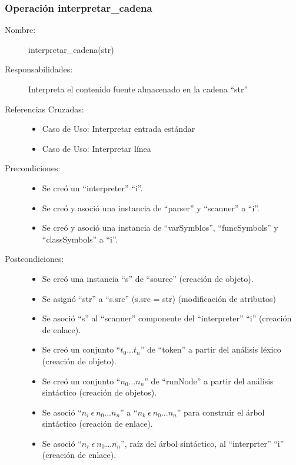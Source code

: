 \subsubsection{Operación interpretar\_cadena}
\FloatBarrier
\begin{framed}
	\begin{description}
		\item [Nombre:] interpretar\_cadena(str)
		\item [Responsabilidades:] Interpreta el contenido fuente almacenado en la cadena ``str''
		\item [Referencias Cruzadas: ] \hfill
      \begin {itemize}
      \item Caso de Uso: Interpretar entrada estándar 
      \item Caso de Uso: Interpretar línea
      \end{itemize}
      \item [Precondiciones:] \hfill
      \begin {itemize}
      \item Se creó un ``interpreter'' ``i''.
      \item Se creó y asoció una instancia de ``parser'' y ``scanner'' a ``i''.
      \item Se creó y asoció una instancia de ``varSymblos'', ``funcSymbols'' y ``classSymbols'' a ``i''.
      \end{itemize}
      \item [Postcondiciones:] \hfill
      \begin {itemize}
         \item Se creó una instancia ``s'' de ``source'' (creación de objeto).
         \item Se asignó ``str'' a ``s.src'' (s.src = str) (modificación de atributos)
         \item Se asoció ``s'' al ``scanner'' componente del ``interpreter'' ``i'' (creación de enlace). 
         \item Se creó un conjunto ``$t_0...t_n$'' de ``token'' a partir del análisis léxico (creación de objeto).
         \item Se creó un conjunto ``$n_0...n_n$'' de ``runNode'' a partir del análisis sintáctico (creación de objetos).
         \item Se asoció ``$n_i\ \epsilon\ n_0...n_n$'' a ``$n_k\ \epsilon\ n_0...n_n$'' para construir el árbol sintáctico (creación de enlace).
         \item Se asoció  ``$n_r\ \epsilon\ n_0...n_n$'', raíz del árbol sintáctico, al ``interprter'' ``i'' (creación de enlace).

\end{itemize}
\end{description}
\end{framed}
